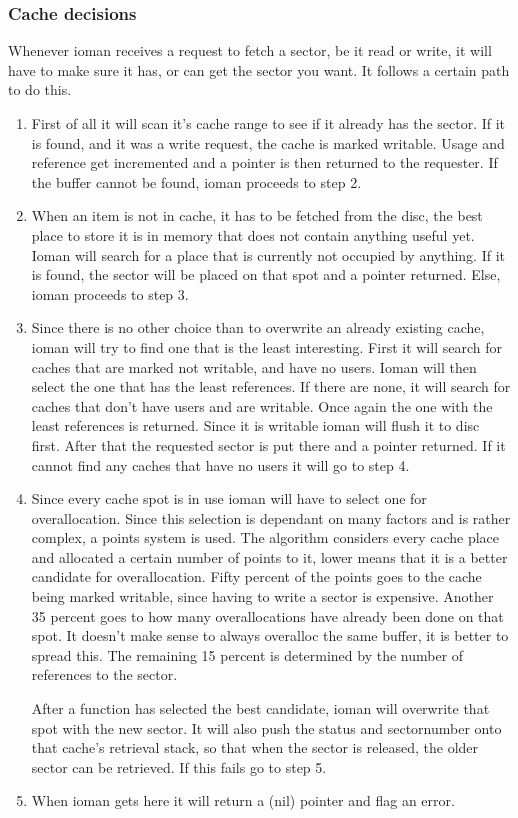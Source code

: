 \subsubsection{Cache decisions}
Whenever ioman receives a request to fetch a sector, be it read or write, it will have to make sure
it has, or can get the sector you want. It follows a certain path to do this.\label{cachemethod}
\begin{enumerate}
	\item First of all it will scan it's cache range to see if it already has the sector.
		If it is found, and it was a write request, the cache is marked writable. Usage and
		reference get incremented and a pointer	is then returned to the requester. If the
		buffer cannot be found, ioman proceeds to step 2.
	\item When an item is not in cache, it has to be fetched from the disc, the best place to
		store it is in memory that does not contain anything useful yet. Ioman will search for
		a place that is currently not occupied by anything. If it is found, the sector will be
		placed on that spot and a pointer returned. Else, ioman proceeds to step 3.
	\item Since there is no other choice than to overwrite an already existing cache, ioman will
		try to find one that is the least interesting. First it will search for caches that
		are marked not writable, and have no users. Ioman will then select the one that has the
		least references. If there are none, it will search for caches that don't have users and
		are writable. Once again the one with the least references is returned. Since it is
		writable ioman will flush it to disc first. After that the requested sector is put there
		and a pointer returned. If it cannot find any caches that have no users it will go to
		step 4.
	\item Since every cache spot is in use ioman will have to select one for overallocation.
		Since this selection is dependant on many factors and is rather complex, a points
		system is used. The algorithm considers every cache place and allocated a certain number
		of points to it, lower means that it is a better candidate for overallocation. Fifty
		percent of the points goes to the cache being marked writable, since having to write
		a sector is expensive. Another 35 percent goes to how many overallocations have
		already been done on that spot. It doesn't make sense to always overalloc the same buffer,
		it is better to spread this. The remaining 15 percent is determined by the number of
		references to the sector.

		After a function has selected the best candidate, ioman will overwrite that spot with
		the new sector. It will also push the status and sectornumber onto that cache's
		retrieval stack, so that when the sector is released, the older sector can be retrieved.
		If this fails go to step 5.
	\item When ioman gets here it will return a (nil) pointer and flag an error.
\end{enumerate}

